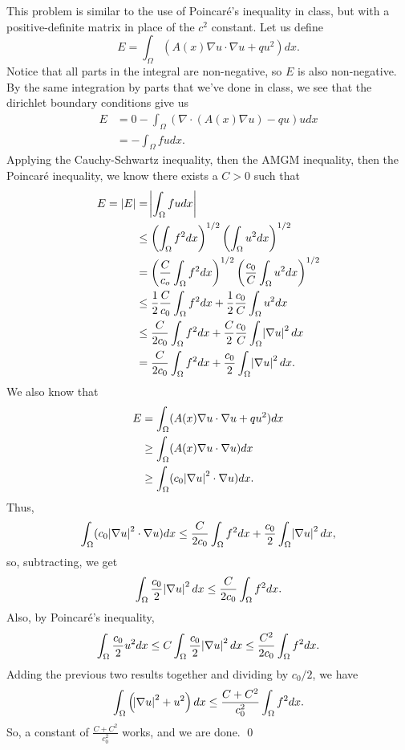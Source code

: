 \documentclass{article}
\newcommand{\D}{\nabla}
\begin{document}
\newpage
{} \tri
\hop
\solution
This problem is similar to the use of Poincar\'e's inequality in class, but with a positive-definite matrix in place of the $c^2$ constant.
\hop 
Let us define 
\[E= \int_\Omega (A(x)\D u \cdot \D u + qu^2)dx.\]
Notice that all parts in the integral are non-negative, so $E$ is also non-negative. By the same integration by parts that we've done in class, we see that the dirichlet boundary conditions give us
\begin{align*}
    E &= 0 - \int_\Omega (\D \cdot (A(x) \D u) - qu)u dx \\
    &= -\int_\Omega fu dx.
\end{align*}
Applying the Cauchy-Schwartz inequality, then the AMGM inequality, then the Poincar\'e inequality, we know there exists a $C > 0$ such that 
\begin{align*}
    E = |E| &= \abs{\int_\Omega fu dx} \\
    &\le \del{\int_\Omega f^2 dx}^{1/2} \del{\int_\Omega u^2 dx}^{1/2} \\
    &= \del{\frac{C}{c_o}\int_\Omega f^2 dx}^{1/2} \del{\frac{c_0}{C}\int_\Omega u^2 dx}^{1/2} \\
    &\le \frac{1}{2}\frac{C}{c_0}\int_\Omega f^2 dx + \frac{1}{2}\frac{c_0}{C}\int_\Omega u^2 dx \\ 
    & \le \frac{C}{2c_0}\int_\Omega f^2 dx + \frac{C}{2}\frac{c_0}{C}\int_\Omega \abs{\D u}^2 dx \\
    &=  \frac{C}{2c_0}\int_\Omega f^2 dx +\frac{c_0}{2}\int_\Omega \abs{\D u}^2 dx.
\end{align*}
We also know that 
\begin{align*}
    E&= \int_\Omega (A(x)\D u \cdot \D u + qu^2)dx\\
    &\ge \int_\Omega (A(x)\D u \cdot \D u)dx\\
    &\ge \int_\Omega (c_0\abs{\D u}^2 \cdot \D u)dx.
\end{align*}
Thus, 
\[ \int_\Omega (c_0\abs{\D u}^2 \cdot \D u)dx \le \frac{C}{2c_0}\int_\Omega f^2 dx +\frac{c_0}{2}\int_\Omega \abs{\D u}^2 dx,\]
so, subtracting, we get 
\[ \int_\Omega \frac{c_0}{2} \abs{\D u}^2 dx \le \frac{C}{2c_0}\int_\Omega f^2 dx.\]
Also, by Poincar\'e's inequality, 
\[\int_\Omega \frac{c_0}{2}u^2 dx \le C \int_\Omega\frac{c_0}{2} \abs{\D u}^2dx \le \frac{C^2}{2c_0}\int_\Omega f^2 dx.\]
Adding the previous two results together and dividing by $c_0/2$, we have 
\[\int_\Omega \del{\abs{\D u}^2  + u^2}dx \le \frac{C+C^2}{c_0^2}\int_\Omega f^2 dx.\]
So, a constant of $\frac{C+C^2}{c_0^2}$ works, and we are done. \qed
\end{document}
